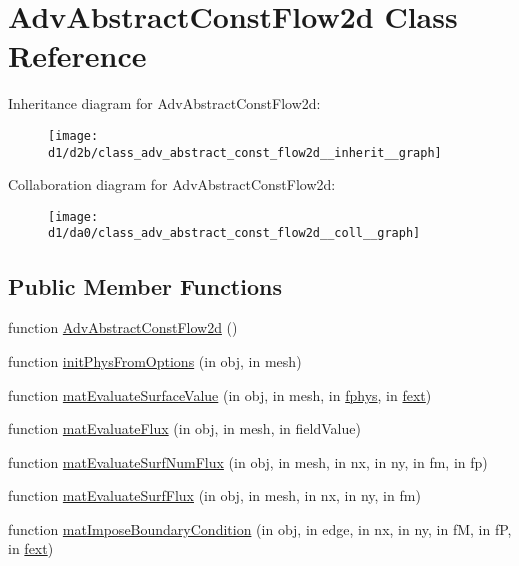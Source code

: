 \hypertarget{class_adv_abstract_const_flow2d}{}\section{Adv\+Abstract\+Const\+Flow2d Class Reference}
\label{class_adv_abstract_const_flow2d}


Inheritance diagram for Adv\+Abstract\+Const\+Flow2d\+:
\nopagebreak
\begin{figure}[H]
\begin{center}
\leavevmode
\texttt{[image: d1/d2b/class\_adv\_abstract\_const\_flow2d\_\_inherit\_\_graph]}
\end{center}
\end{figure}


Collaboration diagram for Adv\+Abstract\+Const\+Flow2d\+:
\nopagebreak
\begin{figure}[H]
\begin{center}
\leavevmode
\texttt{[image: d1/da0/class\_adv\_abstract\_const\_flow2d\_\_coll\_\_graph]}
\end{center}
\end{figure}
\subsection*{Public Member Functions}
\begin{DoxyCompactItemize}
\item 
function \hyperlink{class_adv_abstract_const_flow2d_ac2319f003698c8cb0b1aad7042e4ef32}{Adv\+Abstract\+Const\+Flow2d} ()
\item 
function \hyperlink{class_adv_abstract_const_flow2d_aa7de134cc532e48803c7ce1850cdd87b}{init\+Phys\+From\+Options} (in obj, in mesh)
\item 
function \hyperlink{class_adv_abstract_const_flow2d_ae89cdec7d30e0b3f8b8492c81f139d3b}{mat\+Evaluate\+Surface\+Value} (in obj, in mesh, in \hyperlink{class_ndg_phys_a6b25724fc9474d32018439009072f0a9}{fphys}, in \hyperlink{class_ndg_phys_mat_a2b0e8a77bf5f6fe870b12e400d6d83f3}{fext})
\item 
function \hyperlink{class_adv_abstract_const_flow2d_a06b3dc7d362d2288614a524e1410e587}{mat\+Evaluate\+Flux} (in obj, in mesh, in field\+Value)
\item 
function \hyperlink{class_adv_abstract_const_flow2d_a77c057b0c2f818b35bb4c5b8aba222f2}{mat\+Evaluate\+Surf\+Num\+Flux} (in obj, in mesh, in nx, in ny, in fm, in fp)
\item 
function \hyperlink{class_adv_abstract_const_flow2d_ac9e229070970cae4d0a0107ac6a1b932}{mat\+Evaluate\+Surf\+Flux} (in obj, in mesh, in nx, in ny, in fm)
\item 
function \hyperlink{class_adv_abstract_const_flow2d_aa19c267b755908d1013c3fc2b1b2910b}{mat\+Impose\+Boundary\+Condition} (in obj, in edge, in nx, in ny, in fM, in fP, in \hyperlink{class_ndg_phys_mat_a2b0e8a77bf5f6fe870b12e400d6d83f3}{fext})
\end{DoxyCompactItemize}
